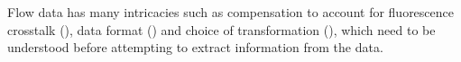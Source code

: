 
Flow data has many intricacies
such as compensation to account for fluorescence crosstalk (),
data format ()
and choice of transformation (),
which need to be understood before attempting to extract information from the data.


